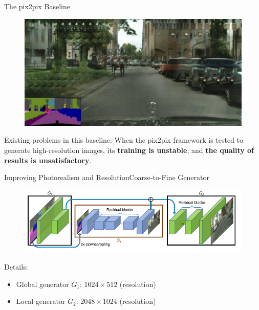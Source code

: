 \documentclass{beamer}
\begin{document}
\begin{frame}{The pix2pix Baseline }
\begin{figure}
	\centering
	\includegraphics[height=0.4\textheight]{images/pix2pix}
\end{figure}
%
%
\begin{beamerboxesrounded}[upper=uppercol,lower=lowercol,shadow=false]{Existing problems in this baseline:}
	When the pix2pix framework is tested to generate high-resolution images, its \textbf{training is unstable}, and \textbf{the quality of results is unsatisfactory}.
\end{beamerboxesrounded}
\end{frame}

\begin{frame}{Improving Photorealism and Resolution}{Coarse-to-Fine Generator}
	\begin{figure}
	\centering
	\includegraphics[height=0.4\textheight]{images/structure}
\end{figure}
%
%
\begin{beamerboxesrounded}[upper=uppercol,lower=lowercol,shadow=false]{Details:}
\begin{itemize}
	\item
	Global generator $G_1$: $1024\times512$ (resolution)
	\item
	Local generator $G_2$: $2048\times1024$ (resolution)
\end{itemize}
\end{beamerboxesrounded}
\end{frame}
\end{document}
